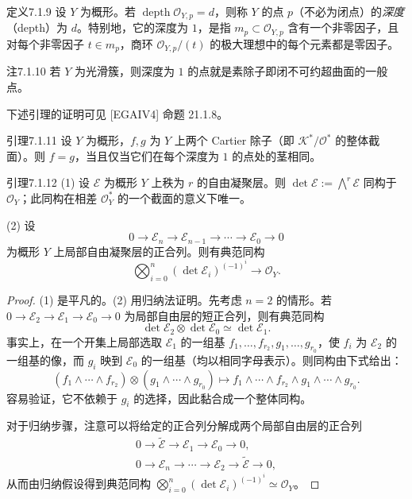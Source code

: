 \begin{origstatement}{定义}{7.1.9}\label{ch07:7.1.9}
设 $Y$ 为概形。若 $\operatorname{depth}\mathcal O_{Y,p}=d$，则称 $Y$ 的点 $p$（不必为闭点）的\emph{深度}（depth）为 $d$。特别地，它的深度为 $1$，是指 $m_p\subset\mathcal O_{Y,p}$ 含有一个非零因子，且对每个非零因子 $t\in m_p$，商环 $\mathcal O_{Y,p}/(t)$ 的极大理想中的每个元素都是零因子。
\end{origstatement}
\begin{origstatement}{注}{7.1.10}\label{ch07:7.1.10}
若 $Y$ 为光滑簇，则深度为 $1$ 的点就是素除子即闭不可约超曲面的一般点。
\end{origstatement}
下述引理的证明可见 [EGAIV4] 命题 21.1.8。

\begin{origstatement}{引理}{7.1.11}\label{ch07:7.1.11}
设 $Y$ 为概形，$f,g$ 为 $Y$ 上两个 Cartier 除子（即 $\mathcal K^*/\mathcal O^*$ 的整体截面）。则 $f=g$，当且仅当它们在每个深度为 $1$ 的点处的茎相同。
\end{origstatement}
\begin{origstatement}{引理}{7.1.12}\label{ch07:7.1.12}
(1) 设 $\mathcal E$ 为概形 $Y$ 上秩为 $r$ 的自由凝聚层。则 $\det\mathcal E:=\bigwedge^r\mathcal E$ 同构于 $\mathcal O_Y$；此同构在相差 $\mathcal O_Y^*$ 的一个截面的意义下唯一。

(2) 设
\[
0\longrightarrow\mathcal E_n\longrightarrow\mathcal E_{n-1}
\longrightarrow\cdots\longrightarrow\mathcal E_0\longrightarrow0
\]
为概形 $Y$ 上局部自由凝聚层的正合列。则有典范同构
\[
\bigotimes_{i=0}^n(\det\mathcal E_i)^{(-1)^i}\longrightarrow\mathcal O_Y.
\]
\end{origstatement}
\begin{proof}
(1) 是平凡的。(2) 用归纳法证明。先考虑 $n=2$ 的情形。若 $0\to\mathcal E_2\to\mathcal E_1\to\mathcal E_0\to0$ 为局部自由层的短正合列，则有典范同构
\[
\det\mathcal E_2\otimes\det\mathcal E_0\simeq\det\mathcal E_1.
\]
事实上，在一个开集上局部选取 $\mathcal E_1$ 的一组基 $f_1,\ldots,f_{r_2},g_1,\ldots,g_{r_0}$，使 $f_i$ 为 $\mathcal E_2$ 的一组基的像，而 $g_i$ 映到 $\mathcal E_0$ 的一组基（均以相同字母表示）。则同构由下式给出：
\[
(f_1\wedge\cdots\wedge f_{r_2})\otimes(g_1\wedge\cdots\wedge g_{r_0})
\longmapsto f_1\wedge\cdots\wedge f_{r_2}\wedge g_1\wedge\cdots\wedge g_{r_0}.
\]
容易验证，它不依赖于 $g_i$ 的选择，因此黏合成一个整体同构。

对于归纳步骤，注意可以将给定的正合列分解成两个局部自由层的正合列
\[
\begin{gathered}
0\longrightarrow\widetilde{\mathcal E}\longrightarrow\mathcal E_1\longrightarrow\mathcal E_0\longrightarrow0,\\
0\longrightarrow\mathcal E_n\longrightarrow\cdots\longrightarrow\mathcal E_2\longrightarrow\widetilde{\mathcal E}\longrightarrow0,
\end{gathered}
\]
从而由归纳假设得到典范同构 $\bigotimes_{i=0}^n(\det\mathcal E_i)^{(-1)^i}\simeq\mathcal O_Y$。
\end{proof}
